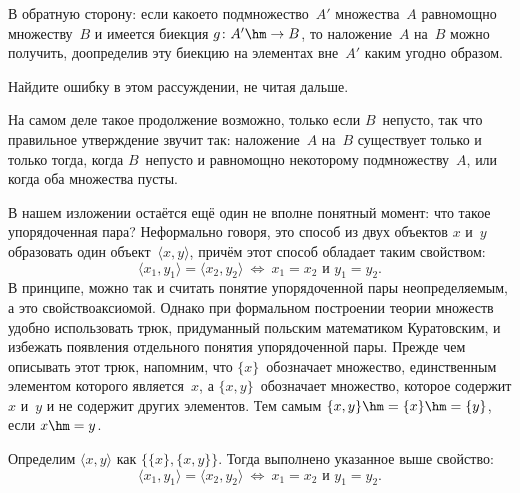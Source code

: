 В обратную сторону: если какое\д то подмножество~$A'$ множества~$A$
равномощно множеству~$B$ и имеется биекция $g\colon A'\hm\to B$,
то наложение~$A$ на~$B$ можно получить, доопределив эту биекцию на
элементах вне~$A'$ каким угодно образом.

\begin{problem}
Найдите ошибку в этом рассуждении, не читая дальше.
\end{problem}

На самом деле такое продолжение возможно, только если $B$~непусто,
так что правильное утверждение звучит так:
наложение~$A$ на~$B$ существует только и только тогда, когда $B$~непусто и
равномощно некоторому подмножеству~$A$, или когда
оба множества пусты.

В нашем изложении остаётся ещё один не вполне понятный момент:
что такое  упорядоченная пара?
Неформально говоря, это
способ из двух объектов $x$ и~$y$ образовать один
объект~$\langle x,y\rangle$, причём этот способ обладает таким
свойством:
        $$
\langle x_1,y_1\rangle = \langle x_2,y_2\rangle
        \
\Leftrightarrow
        \
\text{$x_1=x_2$ и $y_1=y_2$}.
        $$
В принципе, можно так и считать понятие упорядоченной пары
не\-оп\-ре\-де\-ля\-е\-мым, а это свойство\т аксиомой. Однако
при формальном построении теории множеств удобно использовать
трюк, придуманный польским математиком
Куратовским\glossary{Куратовский@\Куратовский}, и избежать
появления отдельного понятия упорядоченной пары. Прежде чем
описывать этот трюк, напомним, что
$\{x\}$~обозначает множество, единственным
элементом которого является~$x$, а
$\{x,y\}$\index{$\{a,b,c\}$}~обозначает множество, которое
содержит $x$ и~$y$ и не содержит других элементов. Тем самым
${\{x,y\}} \hm= {\{x\}} \hm= {\{y\}}$, если $x\hm=y$.

\begin{theorem}
        \label{kuratowski-pair}%
Оп\-ре\-де\-лим $\langle x,y\rangle$ как ${\{\{x\},\{x,y\}\}}$.
Тогда выполнено указанное выше свойство:
        $$
\langle x_1,y_1\rangle = \langle x_2,y_2\rangle
        \
\Leftrightarrow
        \
\text{$x_1=x_2$ и $y_1=y_2$}.
        $$
\end{theorem}


